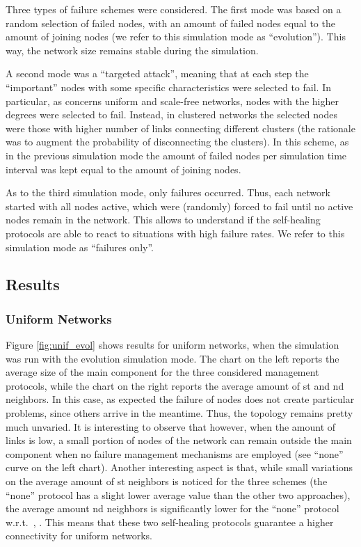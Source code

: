 \documentclass[10pt, conference, compsocconf]{IEEEtran}
\begin{document}
Three types of failure schemes were considered. The first mode was based on a random selection of failed nodes, with an amount of failed nodes equal to the amount of joining nodes (we refer to this simulation mode as ``evolution''). This way, the network size remains stable during the simulation. 

A second mode was a ``targeted attack'', meaning that at each step the ``important'' nodes with some specific characteristics were selected to fail. In particular, as concerns uniform and scale-free networks, nodes with the higher degrees were selected to fail. Instead, in clustered networks the selected nodes were those with higher number of links connecting different clusters (the rationale was to augment the probability of disconnecting the clusters).
In this scheme, as in the previous simulation mode the amount of failed nodes per simulation time interval was kept equal to the amount of joining nodes.

As to the third simulation mode, only failures occurred. Thus, each network started with all nodes active, which were (randomly) forced to fail until no active nodes remain in the network. This allows to understand if the self-healing protocols are able to react to situations with high failure rates. We refer to this simulation mode as ``failures only''.

\subsection{Results}

\subsubsection{Uniform Networks}
Figure \ref{fig:unif_evol} shows results for uniform networks, when the simulation was run with the evolution simulation mode. The chart on the left reports the average size of the main component for the three considered management protocols, while the chart on the right reports the average amount of st and nd neighbors. In this case, as expected the failure of nodes does not create particular problems, since others arrive in the meantime. Thus, the topology remains pretty much unvaried. It is interesting to observe that however, when the amount of links is low, a small portion of nodes of the network can remain outside the main component when no failure management mechanisms are employed (see ``none'' curve on the left chart). 
Another interesting aspect is that, while small variations on the average amount of st neighbors is noticed for the three schemes (the ``none'' protocol has a slight lower average value than the other two approaches), the average amount nd neighbors is significantly lower for the ``none'' protocol w.r.t.~, . This means that these two self-healing protocols guarantee a higher connectivity for uniform networks.
\end{document}
